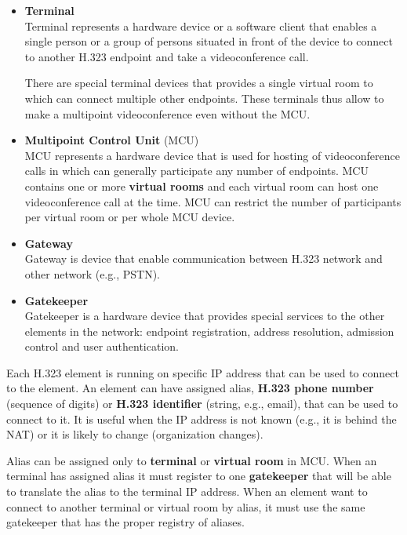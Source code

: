 \documentclass[a4paper]{report}
\begin{document}
\begin{itemize}

\item \textbf{Terminal} \\
Terminal represents a hardware device or a software client that enables a single person or a group of persons situated in front of the device to connect to another H.323 endpoint and take a videoconference call.

There are special terminal devices that provides a single virtual room to which can connect multiple other endpoints.  These terminals thus allow to make a multipoint videoconference even without the MCU.

\item \textbf{Multipoint Control Unit} (MCU) \\
MCU represents a hardware device that is used for hosting of videoconference calls in which can generally participate any number of endpoints. MCU contains one or more \textbf{virtual rooms} and each virtual room can host one videoconference call at the time. MCU can restrict the number of participants per virtual room or per whole MCU device.

\item \textbf{Gateway} \\
Gateway is device that enable communication between H.323 network and other network (e.g., PSTN).

\item \textbf{Gatekeeper} \\
Gatekeeper is a hardware device that provides special services to the other elements in the network: endpoint registration, address resolution, admission control and user authentication.

\end{itemize}

Each H.323 element is running on specific IP address that can be used to connect to the element. An element can have assigned alias, \textbf{H.323 phone number} (sequence of digits) or \textbf{H.323 identifier} (string, e.g., email), that can be used to connect to it. It is useful when the IP address is not known (e.g., it is behind the NAT) or it is likely to change (organization changes).

Alias can be assigned only to \textbf{terminal} or \textbf{virtual room} in MCU. When an terminal has assigned alias it must register to one \textbf{gatekeeper} that will be able to translate the alias to the terminal IP address. When an element want to connect to another terminal or virtual room by alias, it must use the same gatekeeper that has the proper registry of aliases.
\end{document}
